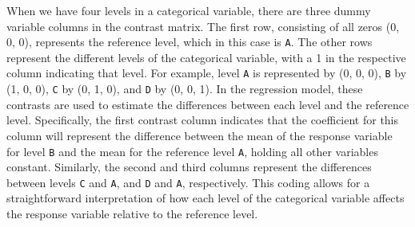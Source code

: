 \documentclass[
  letterpaper,
]{book}
\begin{document}
When we have four levels in a categorical variable, there are three
dummy variable columns in the contrast matrix. The first row, consisting
of all zeros (0, 0, 0), represents the reference level, which in this
case is \texttt{A}. The other rows represent the different levels of the
categorical variable, with a 1 in the respective column indicating that
level. For example, level \texttt{A} is represented by (0, 0, 0),
\texttt{B} by (1, 0, 0), \texttt{C} by (0, 1, 0), and \texttt{D} by (0,
0, 1). In the regression model, these contrasts are used to estimate the
differences between each level and the reference level. Specifically,
the first contrast column indicates that the coefficient for this column
will represent the difference between the mean of the response variable
for level \texttt{B} and the mean for the reference level \texttt{A},
holding all other variables constant. Similarly, the second and third
columns represent the differences between levels \texttt{C} and
\texttt{A}, and \texttt{D} and \texttt{A}, respectively. This coding
allows for a straightforward interpretation of how each level of the
categorical variable affects the response variable relative to the
reference level.
\end{document}
